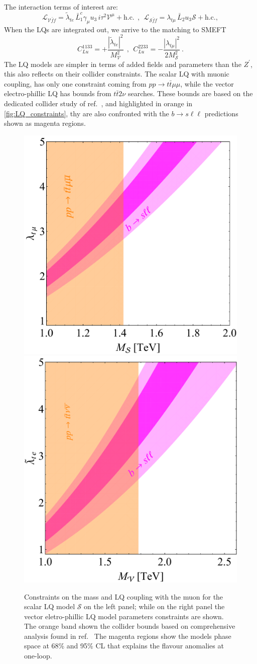 The interaction terms of interest are:
\begin{equation}
	\mathcal{L}_{\mathcal V \bar f f} =  \tilde \lambda_{t e}  \, \bar L^c_1\gamma_\mu u_{3} \, i \tau^2 \mathcal V^\mu  + \mathrm{h.c.} 
	\ \ , \ \
	\mathcal{L}_{\mathcal S \bar f f} =  \lambda_{t \mu} \,  \bar L_2 u_{3} \mathcal{S}  + \mathrm{h.c.} ,
\end{equation}
When the LQs are integrated out, we arrive to the matching to SMEFT
\begin{equation}
	C_{Lu}^{1133} = +\frac{| \tilde \lambda_{t e}|^2}{M_{\mathcal V} ^2 }  
	\ \ , \ \ C_{Lu}^{2233} = -\frac{|  \lambda_{t \mu}|^2}{2 M_{\mathcal S}^2 } \ .
\end{equation}
The LQ models are simpler in terms of added fields and parameters than the $Z^\prime$, this also reflects on their collider constraints. The scalar LQ with muonic coupling, has only one constraint coming from $pp \to t \bar t \mu \mu$, while the vector electro-phillic LQ has bounds from $t \bar t 2 \nu$ searches. These bounds are based on the dedicated collider study of ref.~\cite{Angelescu:2018tyl}, and highlighted in orange in \autoref{fig:LQ_constraints}, thy are also confronted with the $b \to s \ell \ell$ predictions shown as magenta regions.
\begin{figure}[htpb!]
	\centering 
	\includegraphics[width=0.45\linewidth]{figures/Scalar_LQ.pdf}
	\includegraphics[width=0.435\linewidth]{figures/Vector_LQ.pdf}
	\caption{Constraints on the mass and LQ coupling with the muon for the scalar LQ model $\mathcal S$ on the left panel; while on the right panel the vector eletro-phillic LQ model parameters constraints are shown. The orange band shown the collider bounds based on comprehensive analysis found in ref.~\cite{Angelescu:2018tyl} The magenta regions show the models phase space at 68\% and 95\% CL that explains the flavour anomalies at one-loop.}    
	\label{fig:LQ_constraints}
\end{figure}
